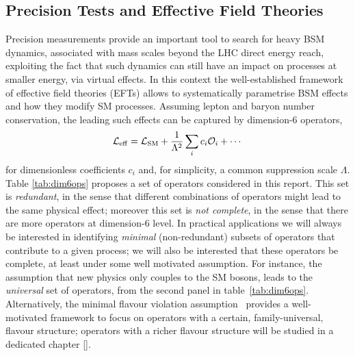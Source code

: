 \subsection{Precision Tests and Effective Field Theories}\label{sec:eftintro}
Precision measurements provide an important tool to search for heavy BSM dynamics, associated with mass scales beyond the LHC direct energy reach,  exploiting the fact that such dynamics can still have an impact on processes at smaller energy, via virtual effects.
%
In this context the well-established framework of effective field theories (EFTs) allows to systematically parametrise BSM effects and how they modify SM processes. Assuming lepton and baryon number conservation, the leading such effects can be captured by dimension-6 operators,
\begin{equation}\label{EFTLAG}
\mathcal{L}_{\rm eff} = \mathcal{L}_{\rm SM} + \frac{1}{\Lambda^2} \sum_{i} c_i \mathcal{O}_i+\cdots
\end{equation}
for dimensionless coefficients $c_i$ and, for simplicity, a common suppression scale $\Lambda$. Table \ref{tab:dim6ops} proposes a  set of operators considered in this report. This set is \emph{redundant}, in the sense that different combinations of operators might lead to the same physical effect; moreover this set is \emph{not complete}, in the sense that there are more  operators at dimension-6 level.
In practical applications we will always be interested in identifying \emph{minimal} (non-redundant) subsets of operators that contribute to a given process; we will also be interested that these operators be complete, at least under some well motivated assumption. For instance, the assumption that new physics only couples to the SM bosons, leads to the \emph{universal} set of operators, from the second panel in table~\ref{tab:dim6ops}. Alternatively, the minimal flavour violation assumption~\cite{DAmbrosio:2002vsn} provides a well-motivated framework to focus on operators with a certain, family-universal, flavour structure; operators with a richer flavour structure will be studied in a dedicated chapter \ref{}.



